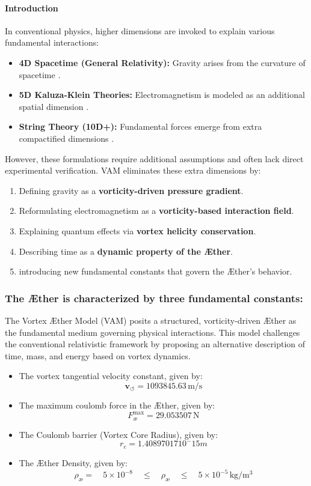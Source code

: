 \documentclass[a4paper,10pt]{article}
\begin{document}
    \paragraph*{Introduction}
    In conventional physics, higher dimensions are invoked to explain various fundamental interactions:
    \begin{itemize}
        \item \textbf{4D Spacetime (General Relativity):} Gravity arises from the curvature of spacetime \cite{Einstein1915}.
        \item \textbf{5D Kaluza-Klein Theories:} Electromagnetism is modeled as an additional spatial dimension \cite{Kaluza1921, Klein1926}.
        \item \textbf{String Theory (10D+):} Fundamental forces emerge from extra compactified dimensions \cite{Polchinski1998}.
    \end{itemize}
    However, these formulations require additional assumptions and often lack direct experimental verification. VAM eliminates these extra dimensions by:
    \begin{enumerate}
        \item Defining gravity as a \textbf{vorticity-driven pressure gradient}.
        \item Reformulating electromagnetism as a \textbf{vorticity-based interaction field}.
        \item Explaining quantum effects via \textbf{vortex helicity conservation}.
        \item Describing time as a \textbf{dynamic property of the Æther}.
        \item introducing new fundamental constants that govern the Æther's behavior.
    \end{enumerate}


\subsubsection*{The Æther is characterized by three fundamental constants:}\label{subsec:the-ae-ther-is-characterized-by-three-fundamental-constants:}

The Vortex Æther Model (VAM) posits a structured, vorticity-driven Æther as the fundamental medium governing physical interactions.
This model challenges the conventional relativistic framework by proposing an alternative description of time, mass, and energy based on vortex dynamics.

\begin{itemize}
    \item The vortex tangential velocity constant, given by: \[\mathbf{v}_{\scriptscriptstyle\boldsymbol{\circlearrowleft}} = 1093845.63 \, \mathrm{m/s}\]
    \item The maximum coulomb force in the Æther, given by:\[F^{\text{max}}_{\text{\ae}} = 29.053507 \, \mathrm{N}\]
    \item The Coulomb barrier (Vortex Core Radius), given by: \[r_c = 1.40897017 10^-15 m\]
    \item The Æther Density, given by: \[\rho_\text{\ae} = \quad 5 \times 10^{-8} \quad \leq \quad \rho_\text{\ae} \quad \leq \quad 5 \times 10^{-5} \, \mathrm{kg/m^3}\]
\end{itemize}
\end{document}

